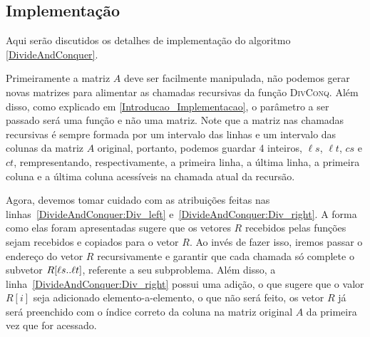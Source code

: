 \subsection{Implementação} \label{DivisaoEConquista_Implementacao}
Aqui serão discutidos os detalhes de implementação do algoritmo \ref{DivideAndConquer}.  

Primeiramente a matriz $A$ deve ser facilmente manipulada, não podemos gerar novas matrizes para alimentar as chamadas recursivas da função \hbox{\textsc{DivConq}}. Além disso, como explicado em \ref{Introducao_Implementacao}, o parâmetro a ser passado será uma função e não uma matriz. Note que a matriz nas chamadas recursivas é sempre formada por um intervalo das linhas e um intervalo das colunas da matriz $A$ original, portanto, podemos guardar 4 inteiros, $\ell s$, $\ell t$, $cs$ e $ct$, rempresentando, respectivamente, a primeira linha, a última linha, a primeira coluna e a última coluna acessíveis na chamada atual da recursão.  

Agora, devemos tomar cuidado com as atribuições feitas nas linhas~\ref{DivideAndConquer:Div_left} e~\ref{DivideAndConquer:Div_right}. A forma como elas foram apresentadas sugere que os vetores $R$ recebidos pelas funções sejam recebidos e copiados para o vetor $R$. Ao invés de fazer isso, iremos passar o endereço do vetor $R$ recursivamente e garantir que cada chamada só complete o subvetor $R[\ell s .. \ell t]$, referente a seu subproblema. Além disso, a linha~\ref{DivideAndConquer:Div_right} possui uma adição, o que sugere que o valor $R[i]$ seja adicionado elemento-a-elemento, o que não será feito, os vetor $R$ já será preenchido com o índice correto da coluna na matriz original $A$ da primeira vez que for acessado.
